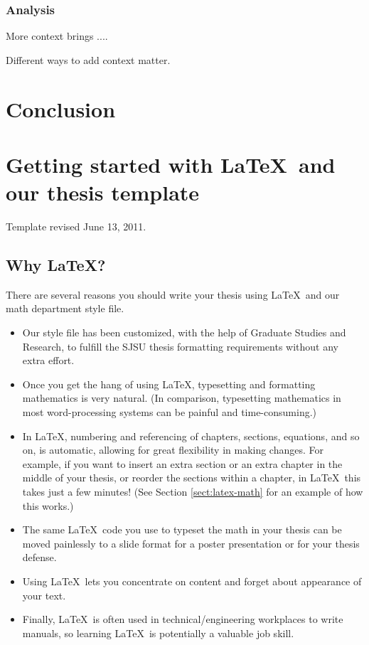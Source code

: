 \documentclass[modernstyle,12pt]{sjsuthesis}
\theoremstyle{definition}
\begin{document}
\subsection{Analysis}
More context brings ....

Different ways to add context matter.

\chapter{Conclusion}

\chapter{Getting started with \LaTeX\ and our thesis template}

Template revised June 13, 2011.

\section{Why \LaTeX?}

There are several reasons you should write your thesis using \LaTeX\
and our math department style file.

\begin{itemize}
\item Our style file has been customized, with the help of Graduate
  Studies and Research, to fulfill the SJSU thesis formatting
  requirements without any extra effort.
\item Once you get the hang of using \LaTeX, typesetting and
  formatting mathematics is very natural.  (In comparison, typesetting
  mathematics in most word-processing systems can be painful and
  time-consuming.)
\item In \LaTeX, numbering and referencing of chapters, sections,
  equations, and so on, is automatic, allowing for great flexibility
  in making changes.  For example, if you want to insert an extra
  section or an extra chapter in the middle of your thesis, or reorder
  the sections within a chapter, in \LaTeX\ this takes just a few
  minutes!  (See Section \ref{sect:latex-math} for an example of how
  this works.)
\item The same \LaTeX\ code you use to typeset the math in your thesis
  can be moved painlessly to a slide format for a poster presentation
  or for your thesis defense.
\item Using \LaTeX\ lets you concentrate on content and forget about
  appearance of your text.
\item Finally, \LaTeX\ is often used in technical/engineering
  workplaces to write manuals, so learning \LaTeX\ is potentially a
  valuable job skill.
\end{itemize}
\end{document}
